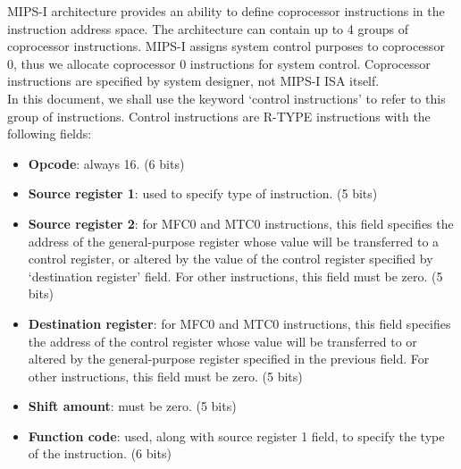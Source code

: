 \documentclass[oneside]{book}
\begin{document}
MIPS-I architecture provides an ability to define coprocessor instructions
in the instruction address space. The architecture can contain up to 4
groups of coprocessor instructions. MIPS-I assigns system control
purposes to coprocessor 0, thus we allocate coprocessor 0 instructions
for system control. Coprocessor instructions are specified by system
designer, not MIPS-I ISA itself.\\

In this document, we shall use the keyword `control instructions' to
refer to this group of instructions. Control instructions are R-TYPE
instructions with the following fields:

\begin{itemize}

\item \textbf{Opcode}: always 16. (6 bits)

\item \textbf{Source register 1}: used to specify type of instruction.
                                  (5 bits)

\item \textbf{Source register 2}: for MFC0 and MTC0 instructions,
                                  this field specifies the address of
                                  the general-purpose register whose
                                  value will be transferred to a
                                  control register, or altered by
                                  the value of the control register
                                  specified by `destination register'
                                  field. For other instructions, this
                                  field must be zero. (5 bits)

\item \textbf{Destination register}: for MFC0 and MTC0 instructions,
                                     this field specifies the address of
                                     the control register whose value
                                     will be transferred to or altered
                                     by the general-purpose register
                                     specified in the previous field.
                                     For other instructions, this field
                                     must be zero. (5 bits)

\item \textbf{Shift amount}: must be zero. (5 bits)

\item \textbf{Function code}: used, along with source register 1 field,
                              to specify the type of the instruction.
                              (6 bits)

\end{itemize}
\end{document}
